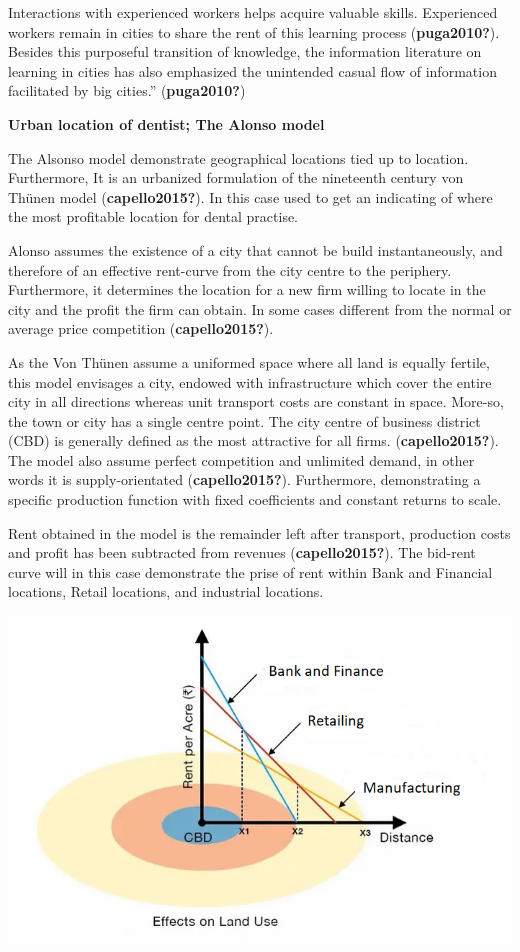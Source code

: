 \documentclass[
  10,
  a4paper,
]{article}
\begin{document}
Interactions with experienced workers helps acquire valuable skills.
Experienced workers remain in cities to share the rent of this learning
process (\textbf{puga2010?}). Besides this purposeful transition of
knowledge, the information literature on learning in cities has also
emphasized the unintended casual flow of information facilitated by big
cities.'' (\textbf{puga2010?})

\textbf{Urban location of dentist; The Alonso model}

The Alsonso model demonstrate geographical locations tied up to
location. Furthermore, It is an urbanized formulation of the nineteenth
century von Thünen model (\textbf{capello2015?}). In this case used to
get an indicating of where the most profitable location for dental
practise.

Alonso assumes the existence of a city that cannot be build
instantaneously, and therefore of an effective rent-curve from the city
centre to the periphery. Furthermore, it determines the location for a
new firm willing to locate in the city and the profit the firm can
obtain. In some cases different from the normal or average price
competition (\textbf{capello2015?}).

As the Von Thünen assume a uniformed space where all land is equally
fertile, this model envisages a city, endowed with infrastructure which
cover the entire city in all directions whereas unit transport costs are
constant in space. More-so, the town or city has a single centre point.
The city centre of business district (CBD) is generally defined as the
most attractive for all firms. (\textbf{capello2015?}). The model also
assume perfect competition and unlimited demand, in other words it is
supply-orientated (\textbf{capello2015?}). Furthermore, demonstrating a
specific production function with fixed coefficients and constant
returns to scale.

Rent obtained in the model is the remainder left after transport,
production costs and profit has been subtracted from revenues
(\textbf{capello2015?}). The bid-rent curve will in this case
demonstrate the prise of rent within Bank and Financial locations,
Retail locations, and industrial locations.

\includegraphics{images/bidrent.gpg.jpg}
\end{document}
